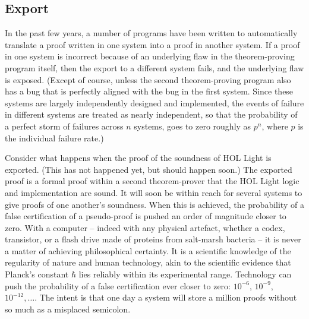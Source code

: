 \documentclass{llncs}
\begin{document}
\subsection{Export}

In the past few years, a number of
programs have been written to automatically translate a proof written in one system into
a proof in another system.  If a proof in one system is incorrect because of an underlying
flaw in the theorem-proving program itself, then the export to
a different system fails, and the underlying flaw is exposed.  (Except of course,
unless the second theorem-proving program also has a bug that is perfectly aligned with the
bug in the first system.  Since these systems are largely independently designed and implemented, 
the events of failure in different systems are
treated as nearly independent, so that the probability of a perfect
storm of failures across $n$ systems, goes to zero roughly as $p^n$, where $p$ is the individual
failure rate.)

Consider what happens when the proof of the soundness of HOL Light is exported.
(This has not happened yet, but should happen soon.)
The exported proof is a formal proof within a second theorem-prover that the HOL Light logic and implementation are sound.  
It will soon be within reach for several systems to give proofs
of one another's soundness.  When this is achieved, the probability of a false certification
of a pseudo-proof is pushed an order of magnitude closer to zero.  With a computer -- indeed with any physical artefact, whether a codex, transistor, or a flash drive made of proteins from salt-marsh bacteria --
it is never a matter of achieving philosophical certainty.
It is a scientific knowledge of the regularity of nature and human technology, akin to the scientific evidence
that Planck's constant $\hbar$ lies reliably within its experimental range.
Technology can push the probability of a false certification
ever closer to zero: $10^{-6}$, $10^{-9}$, $10^{-12},\ldots$. The intent
is 
that one day a system will store a million proofs without so much as a misplaced
semicolon.
\end{document}
